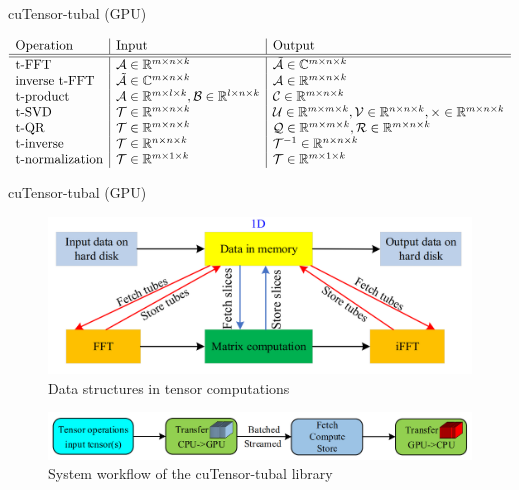 \documentclass[t, 10pt, handout, aspectratio=169]{beamer}
\begin{document}
\begin{frame}{cuTensor-tubal (GPU)}

\begin{table}
$\begin{array}{l | l | l}
\text{Operation} & \text{Input} & \text{Output} \\
\hline \hline
\text{t-FFT} & \mathcal{A}\in\mathbb{R}^{m\times n\times k} & \tilde{\mathcal{A}}\in\mathbb{C}^{m\times n\times k} \\
\text{inverse t-FFT} & \tilde{\mathcal{A}}\in\mathbb{C}^{m\times n\times k} & \mathcal{A}\in\mathbb{R}^{m\times n\times k} \\
\text{t-product} & \mathcal{A}\in\mathbb{R}^{m\times l\times k},\mathcal{B}\in\mathbb{R}^{l\times n\times k} & \mathcal{C}\in\mathbb{R}^{m\times n\times k} \\
\text{t-SVD} & \mathcal{T}\in\mathbb{R}^{m\times n\times k} & \mathcal{U}\in\mathbb{R}^{m\times m\times k},\mathcal{V}\in\mathbb{R}^{n\times n\times k}, \mathcal{\Theta}\in\mathbb{R}^{m\times n\times k} \\
\text{t-QR} & \mathcal{T}\in\mathbb{R}^{m\times n\times k} & \mathcal{Q}\in\mathbb{R}^{m\times m\times k}, \mathcal{R}\in\mathbb{R}^{m\times n\times k} \\
\text{t-inverse} &\mathcal{T}\in\mathbb{R}^{n\times n\times k} &\mathcal{T}^{-1}\in\mathbb{R}^{n\times n\times k} \\
\text{t-normalization} & \mathcal{T}\in\mathbb{R}^{m\times 1\times k} & \mathcal{T}\in\mathbb{R}^{m\times 1\times k}
\end{array}$
\caption{Seven tensor operations in the cuTensor-tubal library}
\end{table}


\end{frame}

\begin{frame}{cuTensor-tubal (GPU)}
\begin{figure}
	\centering  
	\includegraphics[width=0.55\linewidth]{figs/cutensor_datastructure.png}\\
	Data structures in tensor computations
	\label{fig:cutensor_datastructure}
\end{figure}
\begin{figure}
	\centering  
	\includegraphics[width=0.9\linewidth]{figs/cutensor_workflow.png}\\
	System workflow of the cuTensor-tubal library
	\label{fig:cutensor_workflow}
\end{figure}
\end{frame}
\end{document}
